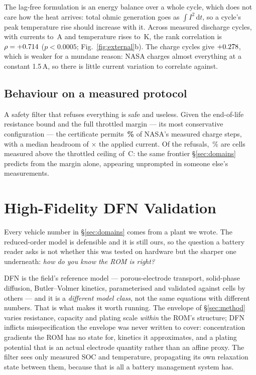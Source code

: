 \documentclass[11pt,letterpaper]{article}
\theoremstyle{definition}
\theoremstyle{remark}
\newcommand{\SI}[2]{#1\,#2}
\newcommand{\degreeCelsius}{\degC}
\newcommand{\degC}{\ifmmode{^\circ}\mathrm{C}\else\textdegree C\fi}
\begin{document}
The lag-free formulation is an energy balance over a whole cycle, which does not care how the
heat arrives: total ohmic generation goes as $\int I^2\,\mathrm{d}t$, so a cycle's peak
temperature rise should increase with it. Across \nDisCycles{} measured discharge cycles, with
currents to \nMaxI\,A and temperature rises to \nMaxDT\,K, the rank correlation is
\textbf{$\rho = +0.714$} ($p < 0.0005$; Fig.~\ref{fig:external}b). The charge cycles give
$+0.278$, which is weaker for a mundane reason: NASA charges almost everything at a constant
1.5\,A, so there is little current variation to correlate against.


\subsection{Behaviour on a measured protocol}

A safety filter that refuses everything is safe and useless. Given the end-of-life resistance
bound and the full throttled margin --- its most conservative configuration --- the certificate
permits \textbf{\nPermitFrac\,\%} of NASA's measured charge steps, with a median headroom of
\nHeadroom$\times$ the applied current. Of the refusals, \nRefuseCeil\,\% are cells measured
above the throttled ceiling of \SI{\nCeiling}{\degreeCelsius}: the same frontier \S\ref{sec:domains}
predicts from the margin alone, appearing unprompted in someone else's measurements.


\section{High-Fidelity DFN Validation}\label{sec:dfn}

Every vehicle number in \S\ref{sec:domains} comes from a plant we wrote. The
reduced-order model is defensible and it is still ours, so the question a battery reader asks is
not whether this was tested on hardware but the sharper one underneath: \emph{how do you know the
ROM is right?}

DFN \cite{doyle1993,newman2004,fuller1994} is the field's reference model --- porous-electrode
transport, solid-phase diffusion, Butler--Volmer kinetics, parameterised and validated against
cells by others --- and it is a \emph{different model class}, not the same equations with
different numbers. That is what makes it worth running. The envelope of \S\ref{sec:method} varies
resistance, capacity and plating scale \emph{within} the ROM's structure; DFN inflicts
misspecification the envelope was never written to cover: concentration gradients the ROM has no
state for, kinetics it approximates, and a plating potential that is an actual electrode quantity
rather than an affine proxy. The filter sees only measured SOC and temperature, propagating its
own relaxation state between them, because that is all a battery management system has.
\end{document}

